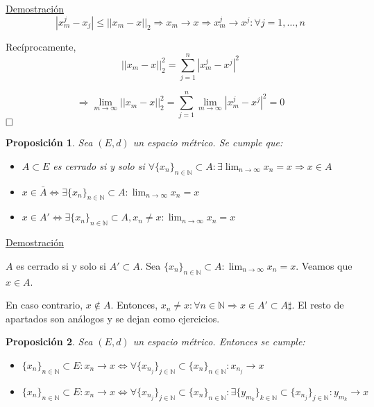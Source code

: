 \documentclass[10pt,a4paper,openright]{book}
\theoremstyle{break}
\newtheorem*{prop}{Proposición}
\begin{document}
\underline{Demostración}
$$|x_m^j - x_j| \leq ||x_m - x||_2 \Rightarrow x_m \to x \Rightarrow x_m^j \to x^j : \forall j = 1, \ldots, n$$

Recíprocamente, 
$$||x_m - x||_2^2 = \sum_{j=1}^{n} |x_m^j - x^j|^2$$

$$\Rightarrow \lim_{m \to \infty} ||x_m - x||_2^2 = \sum_{j=1}^{n} \lim_{m \to \infty} |x_m^j - x^j|^2 = 0$$
$\hfill \square$

\begin{prop}
Sea $(E,d)$ un espacio métrico. Se cumple que:
\begin{itemize}
\item $A \subset E$ es cerrado si y solo si $\forall \{x_n\}_{n\in \mathbb{N}} \subset A : \exists \lim_{n \to \infty} x_n = x \Rightarrow x \in A$

\item $x \in \bar{A} \Leftrightarrow \exists \{x_n\}_{n\in \mathbb{N}} \subset A : \lim_{n \to \infty} x_n = x$

\item $x \in A' \Leftrightarrow \exists \{x_n\}_{n\in \mathbb{N}} \subset A, x_n \neq x: \lim_{n \to \infty} x_n = x$
\end{itemize}
\end{prop}

\underline{Demostración}

$A$ es cerrado si y solo si $A' \subset A$. Sea $\{x_n\}_{n\in \mathbb{N}} \subset A : \lim_{n \to \infty} x_n = x$. Veamos que $x\in A$.

En caso contrario, $x \notin A$. Entonces, $x_n \neq x : \forall n \in \mathbb{N} \Rightarrow x \in A' \subset A \sharp$. El resto de apartados son análogos y se dejan como ejercicios.

\begin{prop}
Sea $(E,d)$ un espacio métrico. Entonces se cumple:
\begin{itemize}
\item $\{x_n\}_{n\in \mathbb{N}} \subset E : x_n \to x \Leftrightarrow \forall\{x_{n_j}\}_{j \in \mathbb{N}} \subset \{x_n\}_{n\in \mathbb{N}} : x_{n_j} \to x$ 

\item $\{x_n\}_{n\in \mathbb{N}} \subset E : x_n \to x \Leftrightarrow \forall\{x_{n_j}\}_{j \in \mathbb{N}} \subset \{x_n\}_{n\in \mathbb{N}} : \exists \{y_{m_k}\}_{k \in \mathbb{N}} \subset \{x_{n_j}\}_{j \in \mathbb{N}} : y_{m_k} \to x$
\end{itemize}

\end{prop}
\end{document}
